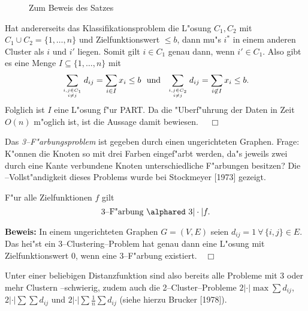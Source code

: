 \begin{figure}[htbp]
\caption{\label{beweis19}Zum Beweis des Satzes}
\end{figure}

Hat andererseits das Klassifikationsproblem die  L"osung $C_1,C_2$ mit
$C_1 \cup C_2 = \{1,\dots,n\}$ und Zielfunktionswert $\leq b$, dann mu"s
$i^*$ in einem anderen Cluster als $i$ und $i'$ liegen. 
Somit gilt $i \in C_1$ genau dann, wenn $i' \in C_1$. Also gibt es
eine Menge $I \subseteq \{1,\dots,n\}$ mit
\[ \sum_{ i,j \in C_1 \atop i \neq j} d_{ij} = \sum_{i \in I} x_i \leq b
	\ \mbox{ und } \ 
	\sum_{i,j \in C_2 \atop i \neq j} d_{ij}=\sum_{i\not\in I} x_i\leq b.\]
Folglich ist $I$ eine L"osung f"ur PART.
Da die "Uberf"uhrung der Daten in Zeit $O(n)$ m"oglich ist, ist die 
Aussage damit bewiesen.
$\quad\Box$
\vspace*{0.5cm}

Das {\em 3--F"arbungsproblem} ist gegeben durch einen ungerichteten Graphen. 
Frage: K"onnen die Knoten so mit drei Farben eingef"arbt werden, da"s
jeweils zwei durch eine Kante verbundene Knoten unterschiedliche
F"arbungen besitzen? Die \NP--Vollst"andigkeit dieses Problems wurde
bei Stockmeyer [1973] gezeigt.


\begin{satz}
F"ur alle Zielfunktionen $f$ gilt
\[ \mbox{3--F"arbung} \ \alphared \ 3|\cdot|f .\]
\end{satz}
{\bf Beweis:}
In einem ungerichteten Graphen $G=(V,E)$ seien $d_{ij}=1 \ \forall\,
\{i,j\} \in E$. Das hei"st ein 3--Clustering--Problem hat genau dann eine
L"osung mit Zielfunktionswert 0, wenn eine 3--F"arbung existiert.$\quad\Box$
\vspace*{0.5cm}

Unter einer beliebigen Distanzfunktion sind also bereits alle Probleme
mit 3 oder mehr Clustern \NP--schwierig, zudem auch die 2--Cluster--Probleme
$2|\cdot|\max \sum d_{ij}$, $2|\cdot|\sum\sum d_{ij}$ und $
2|\cdot|\sum \frac 1n \sum d_{ij}$ (siehe hierzu Brucker [1978]).


